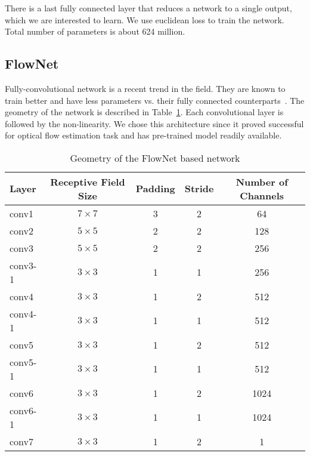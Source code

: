 There is a last fully connected layer that reduces a network to a
single output, which we are interested to learn.  We use euclidean
loss to train the network.  Total number of parameters is about 624
million.


\subsection{FlowNet}

Fully-convolutional network is a recent trend in the field.  They are
known to train better and have less parameters vs. their fully
connected counterparts~\cite{long2015fully}. The geometry of the
network is described in Table~\ref{tab:flownet_geometry}. Each
convolutional layer is followed by the non-linearity.  We chose this
architecture since it proved successful for optical flow estimation
task and has pre-trained model readily available.

\begin{table}[ht]
  \begin{tabular}{lcccc}
    \toprule
    \textbf{Layer} & \textbf{Receptive Field Size} & \textbf{Padding} & \textbf{Stride} & \textbf{Number of Channels}\\
    \midrule
    conv1&   $7\times 7$& 3& 2&   64\\
    conv2&   $5\times 5$& 2& 2&  128\\
    conv3&   $5\times 5$& 2& 2&  256\\
    conv3-1& $3\times 3$& 1& 1&  256\\
    conv4&   $3\times 3$& 1& 2&  512\\
    conv4-1& $3\times 3$& 1& 1&  512\\
    conv5&   $3\times 3$& 1& 2&  512\\
    conv5-1& $3\times 3$& 1& 1&  512\\
    conv6&   $3\times 3$& 1& 2& 1024\\
    conv6-1& $3\times 3$& 1& 1& 1024\\
    conv7&   $3\times 3$& 1& 2&    1\\
    \hline
  \end{tabular}
  \caption{Geometry of the FlowNet based network}
  \label{tab:flownet_geometry}
\end{table}

